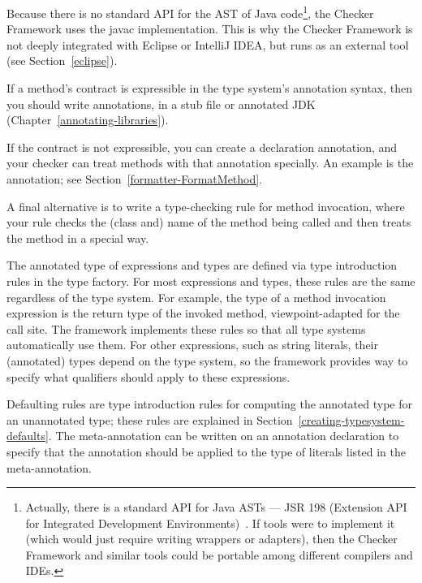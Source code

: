 Because there is no standard API for the AST of Java
code\footnote{Actually, there is a standard API for Java ASTs --- JSR 198
  (Extension API for Integrated Development Environments)~\cite{JSR198}.
  If tools were to implement it (which would just require writing wrappers
  or adapters), then the Checker Framework and similar tools could be
  portable among different compilers and IDEs.}, the Checker Framework uses
the javac implementation.  This is why the Checker Framework is not deeply
integrated with Eclipse or IntelliJ IDEA, but runs as an external tool (see
Section~\ref{eclipse}).



If a method's contract is expressible in the type system's annotation
syntax, then you should write annotations, in a stub file or annotated JDK
(Chapter~\ref{annotating-libraries}).

If the contract is not expressible, you can create a declaration
annotation, and your checker can treat methods with that annotation
specially.  An example is the
 annotation; see
Section~\ref{formatter-FormatMethod}.

A final alternative is to write a type-checking rule for method invocation,
where your rule checks the (class and) name of the method
being called and then treats the method in a special way.



The annotated type of expressions and types are defined via type introduction rules in the
type factory.  For most expressions and types, these rules are the same regardless of the type system.
For example, the type of a method invocation expression is the return type of the invoked method,
viewpoint-adapted for the call site.  The framework implements these rules so that all type systems
automatically use them.  For other expressions, such as string literals, their (annotated) types depend
on the type system, so the framework provides way to specify what qualifiers should apply to these expressions.

Defaulting rules are type introduction rules for computing the annotated type for an unannotated type;
these rules are explained in Section~\ref{creating-typesystem-defaults}. The meta-annotation  can be written on an annotation
declaration to specify that the annotation should be applied to the type of literals listed in the
meta-annotation.

